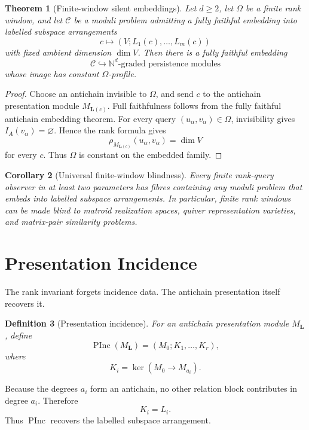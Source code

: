 \documentclass[11pt]{article}
\newtheorem{theorem}{Theorem}[section]
\newtheorem{corollary}[theorem]{Corollary}
\newtheorem{definition}[theorem]{Definition}
\begin{document}
\begin{theorem}[Finite-window silent embeddings]
Let \(d\ge2\), let \(\Omega\) be a finite rank window, and let \(\mathcal C\) be a moduli problem admitting a fully faithful embedding into labelled subspace arrangements
\[
c\longmapsto (V;L_1(c),\ldots,L_m(c))
\]
with fixed ambient dimension \(\dim V\). Then there is a fully faithful embedding
\[
\mathcal C\hookrightarrow \mathbb N^d\text{-graded persistence modules}
\]
whose image has constant \(\Omega\)-profile.
\end{theorem}

\begin{proof}
Choose an antichain invisible to \(\Omega\), and send \(c\) to the antichain presentation module \(M_{\mathbf L(c)}\). Full faithfulness follows from the fully faithful antichain embedding theorem. For every query \((u_\alpha,v_\alpha)\in\Omega\), invisibility gives \(I_A(v_\alpha)=\varnothing\). Hence the rank formula gives
\[
\rho_{M_{\mathbf L(c)}}(u_\alpha,v_\alpha)
=
\dim V
\]
for every \(c\). Thus \(\Omega\) is constant on the embedded family.
\end{proof}

\begin{corollary}[Universal finite-window blindness]
Every finite rank-query observer in at least two parameters has fibres containing any moduli problem that embeds into labelled subspace arrangements. In particular, finite rank windows can be made blind to matroid realization spaces, quiver representation varieties, and matrix-pair similarity problems.
\end{corollary}

\section{Presentation Incidence}

The rank invariant forgets incidence data. The antichain presentation itself recovers it.

\begin{definition}[Presentation incidence]
For an antichain presentation module \(M_{\mathbf L}\), define
\[
\operatorname{PInc}(M_{\mathbf L})
=
\left(M_0;K_1,\ldots,K_r\right),
\]
where
\[
K_i=\ker(M_0\to M_{a_i}).
\]
\end{definition}

Because the degrees \(a_i\) form an antichain, no other relation block contributes in degree \(a_i\). Therefore
\[
K_i=L_i.
\]
Thus \(\operatorname{PInc}\) recovers the labelled subspace arrangement.
\end{document}
